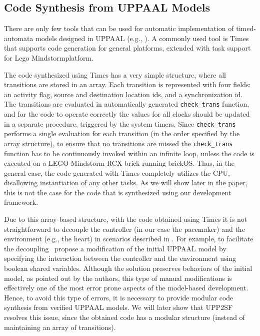\subsection{Code Synthesis from UPPAAL Models}
\label{sec:code_gen}
There are only few tools that can be used for automatic implementation of timed-automata models designed in UPPAAL (e.g., \cite{times,up2nqc}). A commonly used tool is Times~\cite{times} that supports code generation for general platforms, extended with task support for {Lego Mindstorm}\texttrademark  platform. 

The code synthesized using Times has a very simple structure, where all transitions are stored in an array. Each transition is represented with four fields: an activity flag, source and destination location ids, and a synchronization id. The transitions are evaluated in automatically generated \texttt{check\_trans} function, and for the code to operate correctly the values for all clocks should be updated in a separate procedure, triggered by the system timers. Since \texttt{check\_trans} performs a single evaluation for each transition (in the order specified by the array structure), to ensure that no transitions are missed the \texttt{check\_trans} function has to be continuously invoked within an infinite loop, unless the code is executed on a LEGO Mindstorm RCX brick running brickOS. Thus, in the general case, the code generated with Times completely utilizes the CPU, disallowing instantiation of any other tasks. As we will show later in the paper, this is not the case for the code that is synthesized using our development framework.

Due to this array-based structure, with the code obtained using Times it is not straightforward to decouple the controller (in our case the pacemaker) and the environment (e.g., the heart) in scenarios described in . For example, to facilitate the decoupling~\cite{kim_emsoft11} propose a modification of the initial UPPAAL model by specifying the interaction between the controller and the environment using boolean shared variables. 
Although the solution preserves behaviors of the initial model, as pointed out by the authors, this type of manual modifications is effectively one of the most error prone aspects of the model-based development. Hence, to avoid this type of errors, it is necessary to provide modular code synthesis from verified UPPAAL models. We will later show  that UPP2SF resolves this issue, since the obtained code has a modular structure (instead of maintaining an array of transitions).

